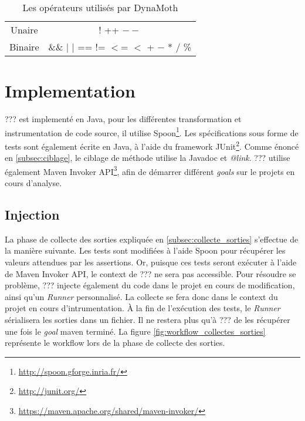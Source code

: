 \begin{table}[H]
\centering
\begin{tabular}{|c|c|}
\hline
Unaire & ! ++ $--$ \\
Binaire & \&\& $|$ $|$ == != $<$= $<$ + $-$ * / \% \\
\hline

\end{tabular}
\caption{Les opérateurs utilisés par DynaMoth}
\label{fig:operateurs}
\end{table}
 

\section{Implementation}
\label{sec:implementation}

\par ??? est implementé en Java, pour les différentes transformation et instrumentation de code source, il utilise Spoon\footnote{\url{http://spoon.gforge.inria.fr/}}. Les spécifications sous forme de tests sont également écrite en Java, à l'aide du framework JUnit\footnote{\url{http://junit.org/}}. Comme énoncé en \ref{subsec:ciblage}, le ciblage de méthode utilise la Javadoc et \textit{@link}. ??? utilise également Maven Invoker API\footnote{\url{https://maven.apache.org/shared/maven-invoker/}}, afin de démarrer différent \textit{goals} sur le projets en cours d'analyse.


\subsection{Injection}

\par La phase de collecte des sorties expliquée en \ref{subsec:collecte_sorties} s'effectue de la manière suivante. Les tests sont modifiées à l'aide Spoon pour récupérer les valeurs attendues par les assertions. Or, puisque ces tests seront exécuter à l'aide de Maven Invoker API, le context de ??? ne sera pas accessible. Pour résoudre se problème, ??? injecte également du code dans le projet en cours de modification, ainsi qu'un \textit{Runner} personnalisé. La collecte se fera donc dans le context du projet en cours d'intrumentation. À la fin de l'exécution des tests, le \textit{Runner} sérialisera les sorties dans un fichier. Il ne restera plus qu'à ??? de les récupérer une fois le \textit{goal} maven terminé. La figure \ref{fig:workflow_collectes_sorties} représente le workflow lors de la phase de collecte des sorties.

